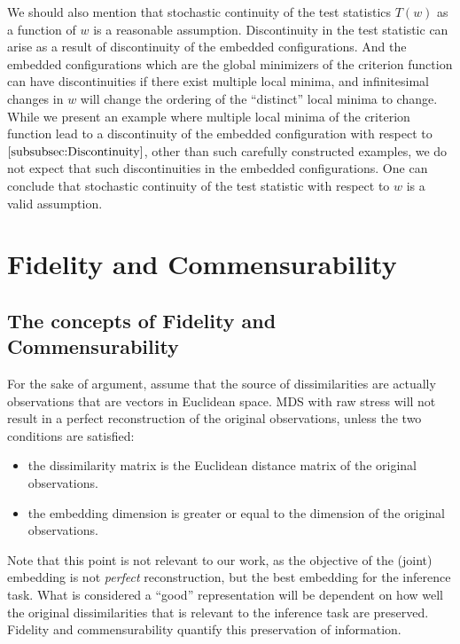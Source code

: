 \documentclass[12pt,oneside,final]{thesis}\usepackage[]{graphicx}\usepackage[]{color}
\begin{document}
We should also mention that stochastic continuity of the test statistics $T(w)$ as a function of $w$  is a reasonable assumption. Discontinuity in the test statistic can arise as  a result of discontinuity of the embedded configurations. And the embedded configurations which are the global minimizers of the criterion function can have discontinuities if  there exist multiple local minima, and  infinitesimal changes in $w$ will change the ordering of the ``distinct'' local minima to change. While  we present an example where multiple local minima of the criterion function  lead to  a discontinuity of the embedded configuration  with respect to $\ref{subsubsec:Discontinuity}$, other than such carefully constructed examples, we do not expect that such discontinuities in the embedded configurations. 
One can conclude  that stochastic continuity of the test statistic with respect to $w$  is a valid assumption.




\chapter{Fidelity and Commensurability}
\label{chap:FidComm}

\section{The concepts of  Fidelity and Commensurability\label{chap:FidComm}}

For the sake of argument, assume that the source of dissimilarities  are actually observations that are vectors in Euclidean space. MDS with raw stress will not result in a perfect reconstruction  of the original observations, unless the two conditions are satisfied:
\begin{itemize}
\item the dissimilarity matrix is the Euclidean distance matrix of the original observations. 
\item the embedding dimension is greater or equal to the dimension of the original observations.
\end{itemize}
 Note that this point is not relevant to our work, as   the objective of the (joint) embedding is not \emph{perfect} reconstruction, but the best embedding for the inference task. What is considered a ``good''  representation will be dependent on how well the original dissimilarities that is relevant to the inference task are preserved. Fidelity and commensurability quantify this preservation of information.
\end{document}
